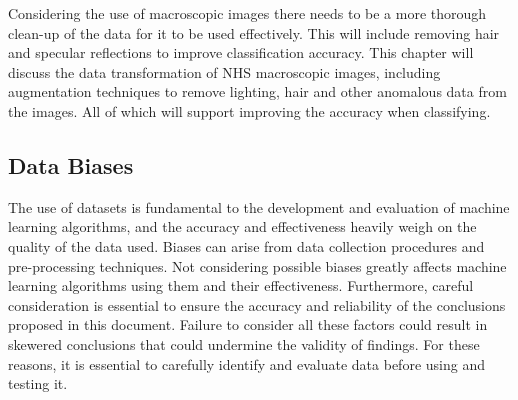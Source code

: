 Considering the use of macroscopic images there needs to be a more thorough clean-up of the data for it to be used effectively. This will include removing hair and specular reflections to improve classification accuracy. This chapter will discuss the data transformation of NHS macroscopic images, including augmentation techniques to remove lighting, hair and other anomalous data from the images. All of which will support improving the accuracy when classifying.

\subsection{Data Biases}
The use of datasets is fundamental to the development and evaluation of machine learning algorithms, and the accuracy and effectiveness heavily weigh on the quality of the data used. Biases can arise from data collection procedures and pre-processing techniques. Not considering possible biases greatly affects machine learning algorithms using them and their effectiveness. Furthermore, careful consideration is essential to ensure the accuracy and reliability of the conclusions proposed in this document. Failure to consider all these factors could result in skewered conclusions that could undermine the validity of findings. For these reasons, it is essential to carefully identify and evaluate data before using and testing it.

